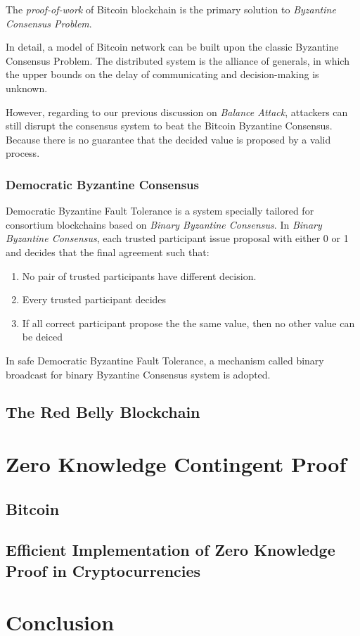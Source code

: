 \documentclass[12pt]{article}
\begin{document}
The \textit{proof-of-work} of Bitcoin blockchain is the primary solution to \textit{Byzantine Consensus Problem}. 

In detail, a model of Bitcoin network can be built upon the classic Byzantine Consensus Problem. The distributed system is the alliance of generals, in which the upper bounds on the delay of communicating and decision-making is unknown. 

However, regarding to our previous discussion on \textit{Balance Attack}, attackers can still disrupt the consensus system to beat the Bitcoin Byzantine Consensus. Because there is no guarantee that the decided value is proposed by a valid process.

\subsubsection{Democratic Byzantine Consensus}

Democratic Byzantine Fault Tolerance is a system specially tailored for consortium blockchains based on \textit{Binary Byzantine Consensus}. In \textit{Binary Byzantine Consensus}, each trusted participant issue proposal with either 0 or 1 and decides that the final agreement such that:

\begin{enumerate}
    \item No pair of trusted participants have different decision.
    \item Every trusted participant decides
    \item If all correct participant propose the the same value, then no other value can be deiced
\end{enumerate}

In safe Democratic Byzantine Fault Tolerance, a mechanism called binary broadcast for binary Byzantine Consensus system is adopted.

\subsection{The Red Belly Blockchain}

\section{Zero Knowledge Contingent Proof}
\label{sec:Zero Knowledge Contingent Proof}

\subsection{Bitcoin}

\subsection{Efficient Implementation of Zero Knowledge Proof in Cryptocurrencies}

\section{Conclusion}

\newpage


\end{document}
